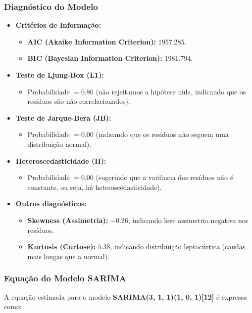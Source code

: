 \documentclass[a4paper, 12pt]{article}
\begin{document}
\subsubsection*{Diagnóstico do Modelo}
\begin{itemize}
    \item \textbf{Critérios de Informação:}
    \begin{itemize}
        \item \textbf{AIC (Akaike Information Criterion):} 1957.285. 
        \item \textbf{BIC (Bayesian Information Criterion):} 1981.794.
    \end{itemize}
    \item \textbf{Teste de Ljung-Box (L1):}
    \begin{itemize}
        \item Probabilidade \( = 0.86 \) (não rejeitamos a hipótese nula, indicando que os resíduos são não correlacionados).
    \end{itemize}
    \item \textbf{Teste de Jarque-Bera (JB):}
    \begin{itemize}
        \item Probabilidade \( = 0.00 \) (indicando que os resíduos não seguem uma distribuição normal).
    \end{itemize}
    \item \textbf{Heteroscedasticidade (H):}
    \begin{itemize}
        \item Probabilidade \( = 0.00 \) (sugerindo que a variância dos resíduos não é constante, ou seja, há heteroscedasticidade).
    \end{itemize}
    \item \textbf{Outros diagnósticos:}
    \begin{itemize}
        \item \textbf{Skewness (Assimetria):} \(-0.26\), indicando leve assimetria negativa nos resíduos.
        \item \textbf{Kurtosis (Curtose):} \(5.38\), indicando distribuição leptocúrtica (caudas mais longas que a normal).
    \end{itemize}
\end{itemize}

\subsubsection*{Equação do Modelo SARIMA}
A equação estimada para o modelo \textbf{SARIMA(3, 1, 1)(1, 0, 1)[12]} é expressa como:
\end{document}
